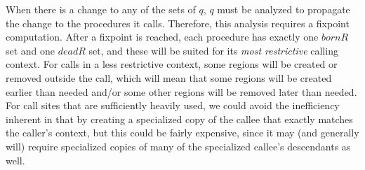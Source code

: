 \documentclass{tlp}
\def\bornRegs{\mathit{bornR}}
\def\deadRegs{\mathit{deadR}}
\begin{document}
When there is a change to any of the sets of $q$,
$q$ must be analyzed to propagate the change to the procedures it calls.
Therefore, this analysis requires a fixpoint computation.
After a fixpoint is reached,
each procedure has exactly one $\bornRegs$ set and one $\deadRegs$ set,
and these will be suited for its \emph{most restrictive} calling context.
For calls in a less restrictive context,
some regions will be created or removed outside the call,
which will mean that
some regions will be created earlier than needed and/or
some other regions will be removed later than needed.
For call sites that are sufficiently heavily used,
we could avoid the inefficiency inherent in that
by creating a specialized copy of the callee
that exactly matches the caller's context,
but this could be fairly expensive,
since it may (and generally will) require
specialized copies of many of the specialized callee's descendants as well.
\end{document}
